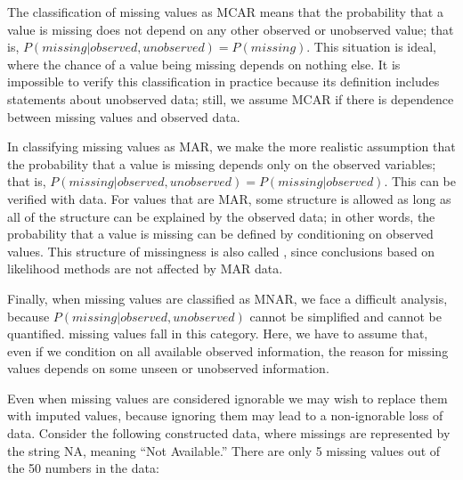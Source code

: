 The classification of missing values as MCAR means that the
probability that a value is missing does not depend on any other
observed or unobserved value; that is, $P(missing | observed,
unobserved) = P(missing)$.  This situation is ideal, where the chance
of a value being missing depends on nothing else. It is impossible to
verify this classification in practice because its definition includes
statements about unobserved data; still, we assume MCAR if there is
dependence between missing values and observed data.

In classifying missing values as MAR, we make the more realistic
assumption that the probability that a value is missing depends only
on the observed variables; that is, $P(missing | observed, unobserved)
= P(missing | observed)$. This can be verified with data.  For values
that are MAR, some structure is allowed as long as all of the
structure can be explained by the observed data; in other words, the
probability that a value is missing can be defined by conditioning on
observed values. This structure of missingness is also called
, since conclusions based on likelihood methods are
not affected by MAR data.


Finally, when missing values are classified as MNAR, we face a
difficult analysis, because $P(missing | observed, unobserved)$ cannot
be simplified and cannot be quantified.   missing
values fall in this category. Here, we have to assume that, even if we
condition on all available observed information, the reason for
missing values depends on some unseen or unobserved information.

Even when missing values are considered ignorable we may wish to
replace them with imputed values, because ignoring them may lead to a
non-ignorable loss of data.  Consider the following constructed data,
where missings are represented by the string NA, meaning ``Not
Available.''  There are only 5 missing values out of the 50 numbers in
the data:

